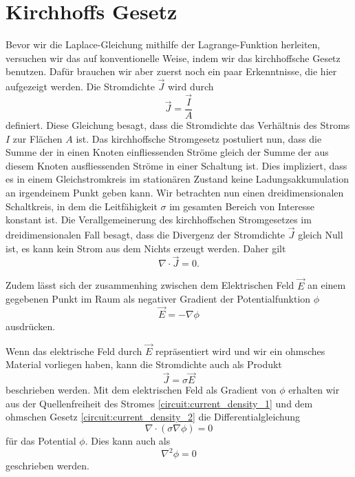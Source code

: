 %
%
%
%
\section{Kirchhoffs Gesetz
\label{circuit:section:teil1}}
Bevor wir die Laplace-Gleichung mithilfe der Lagrange-Funktion herleiten, versuchen wir das auf konventionelle Weise, indem wir  das kirchhoffsche Gesetz benutzen. 
Dafür brauchen wir aber zuerst noch ein paar Erkenntnisse, die hier aufgezeigt werden. Die Stromdichte $\vec{J}$ wird durch
\begin{equation}
	\vec{J}=\frac{\vec{I}}{A}
	\label{circuit:current_density_3}
\end{equation}
definiert. Diese Gleichung besagt, dass die Stromdichte das Verhältnis des Stroms $I$ zur Flächen $A$ ist. 
Das kirchhoffsche Stromgesetz postuliert nun, dass die Summe der in einen Knoten einfliessenden Ströme gleich der Summe der aus diesem Knoten ausfliessenden Ströme in einer Schaltung ist. Dies impliziert, dass es in einem Gleichstromkreis im stationären Zustand keine Ladungsakkumulation an irgendeinem Punkt geben kann. Wir betrachten nun einen dreidimensionalen Schaltkreis, in dem die Leitfähigkeit $\sigma$ im gesamten Bereich von Interesse konstant ist. Die Verallgemeinerung des kirchhoffschen Stromgesetzes im dreidimensionalen Fall besagt, dass die Divergenz der Stromdichte $\vec{J}$ gleich Null ist, es kann kein Strom aus dem Nichts erzeugt werden. Daher gilt 
\begin{equation}
	\nabla \cdot  \vec{J}=0.
	\label{circuit:current_density_1}
\end{equation}

Zudem lässt sich der zusammenhing zwischen dem Elektrischen Feld $\vec{E}$ an einem gegebenen Punkt im Raum als negativer Gradient der Potentialfunktion $\phi$ 
\begin{equation}
	\vec{E}=-\nabla \phi
	\label{circuit:current_density_4}
\end{equation}
ausdrücken.

Wenn das elektrische Feld durch $\vec{E}$ repräsentiert wird und wir ein ohmsches Material vorliegen haben, kann die Stromdichte auch als Produkt  
\begin{equation}
\vec{J}=\sigma \vec{E}
\label{circuit:current_density_2}
\end{equation}
beschrieben werden.
Mit dem elektrischen Feld als Gradient von $\phi$ erhalten wir aus der Quellenfreiheit des Stromes \eqref{circuit:current_density_1} und dem ohmschen Gesetz \eqref{circuit:current_density_2} die Differentialgleichung 
\begin{equation}
	\nabla \cdot (\sigma \nabla \phi)=0
	\label{circuit:current_density_5}
\end{equation}
für das Potential $\phi$. Dies kann auch als
\begin{equation}
\nabla^2 \phi=0
\label{circuit:current_density_6}
\end{equation}
geschrieben werden.

